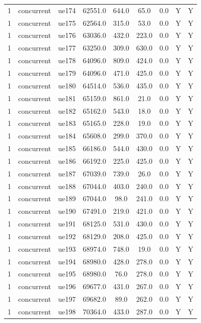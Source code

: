 \begin{table}[ht]
\begin{tabular}{|c|c|c|c|c|c|c|c|c|}
1 & concurrent & ue174 & 62551.0 & 644.0 & 65.0 & 0.0 & Y & Y \\
1 & concurrent & ue175 & 62564.0 & 315.0 & 53.0 & 0.0 & Y & Y \\
1 & concurrent & ue176 & 63036.0 & 432.0 & 223.0 & 0.0 & Y & Y \\
1 & concurrent & ue177 & 63250.0 & 309.0 & 630.0 & 0.0 & Y & Y \\
1 & concurrent & ue178 & 64096.0 & 809.0 & 424.0 & 0.0 & Y & Y \\
1 & concurrent & ue179 & 64096.0 & 471.0 & 425.0 & 0.0 & Y & Y \\
1 & concurrent & ue180 & 64514.0 & 536.0 & 435.0 & 0.0 & Y & Y \\
1 & concurrent & ue181 & 65159.0 & 861.0 & 21.0 & 0.0 & Y & Y \\
1 & concurrent & ue182 & 65162.0 & 543.0 & 18.0 & 0.0 & Y & Y \\
1 & concurrent & ue183 & 65165.0 & 228.0 & 19.0 & 0.0 & Y & Y \\
1 & concurrent & ue184 & 65608.0 & 299.0 & 370.0 & 0.0 & Y & Y \\
1 & concurrent & ue185 & 66186.0 & 544.0 & 430.0 & 0.0 & Y & Y \\
1 & concurrent & ue186 & 66192.0 & 225.0 & 425.0 & 0.0 & Y & Y \\
1 & concurrent & ue187 & 67039.0 & 739.0 & 26.0 & 0.0 & Y & Y \\
1 & concurrent & ue188 & 67044.0 & 403.0 & 240.0 & 0.0 & Y & Y \\
1 & concurrent & ue189 & 67044.0 & 98.0 & 241.0 & 0.0 & Y & Y \\
1 & concurrent & ue190 & 67491.0 & 219.0 & 421.0 & 0.0 & Y & Y \\
1 & concurrent & ue191 & 68125.0 & 531.0 & 430.0 & 0.0 & Y & Y \\
1 & concurrent & ue192 & 68129.0 & 208.0 & 425.0 & 0.0 & Y & Y \\
1 & concurrent & ue193 & 68974.0 & 748.0 & 19.0 & 0.0 & Y & Y \\
1 & concurrent & ue194 & 68980.0 & 428.0 & 278.0 & 0.0 & Y & Y \\
1 & concurrent & ue195 & 68980.0 & 76.0 & 278.0 & 0.0 & Y & Y \\
1 & concurrent & ue196 & 69677.0 & 431.0 & 267.0 & 0.0 & Y & Y \\
1 & concurrent & ue197 & 69682.0 & 89.0 & 262.0 & 0.0 & Y & Y \\
1 & concurrent & ue198 & 70364.0 & 433.0 & 287.0 & 0.0 & Y & Y \\

\end{tabular}
\end{table}
